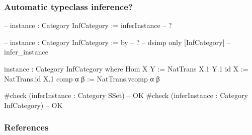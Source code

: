 \documentclass{beamer}
\begin{document}
\begin{frame}[fragile] %
\frametitle{Automatic typeclass inference?}
  \begin{leancode}
  -- instance : Category InfCategory := inferInstance -- ?
  
  -- instance : Category InfCategory := by -- ?
  --   dsimp only [InfCategory]
  --   infer_instance
  
  instance : Category InfCategory where
    Hom X Y := NatTrans X.1 Y.1
    id X := NatTrans.id X.1
    comp α β := NatTrans.vcomp α β

  #check (inferInstance : Category SSet) -- OK
  #check (inferInstance : Category InfCategory) -- OK
  \end{leancode}
\end{frame}


\begin{frame}[allowframebreaks]
	\nocite{*}
       \frametitle{References}
\end{frame}


\end{document}
